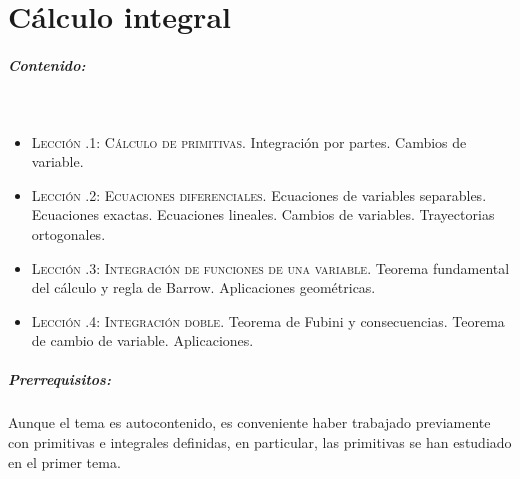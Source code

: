 %
\chapter{Cálculo integral}\label{tema-int}

\pagestyle{temas}
\thispagestyle{primera}

\paragraph{Contenido:}\ \par\vspace{-1em}
\begin{itemize}
\item
{\scshape Lección \thechapter.1: Cálculo de primitivas.}
Integración por partes.
Cambios de variable.

\item
{\scshape Lección \thechapter.2: Ecuaciones diferenciales.}
Ecuaciones de variables separables.
Ecuaciones exactas.
Ecuaciones lineales.
Cambios de variables.
Trayectorias ortogonales.

\item
{\scshape Lección \thechapter.3: Integración de funciones de una variable.}
Teorema fundamental del cálculo y regla de Barrow.
Aplicaciones geométricas.

\item
{\scshape Lección \thechapter.4: Integración doble.}
Teorema de Fubini y consecuencias.
Teorema de cambio de variable.
Aplicaciones.

\end{itemize}

\paragraph{Prerrequisitos:}
Aunque el tema es autocontenido, es conveniente haber trabajado previamente con primitivas e integrales definidas, en particular, las primitivas se han estudiado en el primer tema.


